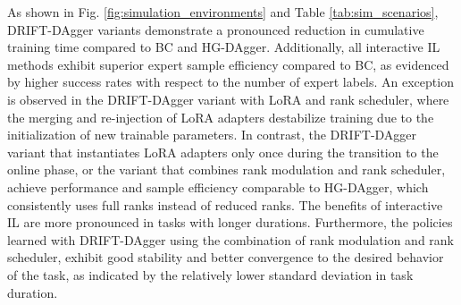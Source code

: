 As shown in Fig. \ref{fig:simulation_environments} and Table \ref{tab:sim_scenarios}, DRIFT-DAgger variants demonstrate a pronounced reduction in cumulative training time compared to BC and HG-DAgger.  Additionally, all interactive IL methods exhibit superior expert sample efficiency compared to BC, as evidenced by higher success rates with respect to the number of expert labels. An exception is observed in the DRIFT-DAgger variant with LoRA and rank scheduler, where the merging and re-injection of LoRA adapters destabilize training due to the initialization of new trainable parameters. In contrast, the DRIFT-DAgger variant that instantiates LoRA adapters only once during the transition to the online phase, or the variant that combines rank modulation and rank scheduler, achieve performance and sample efficiency comparable to HG-DAgger, which consistently uses full ranks instead of reduced ranks. The benefits of interactive IL are more pronounced in tasks with longer durations. 
Furthermore, the policies learned with DRIFT-DAgger using the combination of rank modulation and rank scheduler, exhibit good stability and better convergence to the desired behavior of the task, as indicated by the relatively lower standard deviation in task duration.


